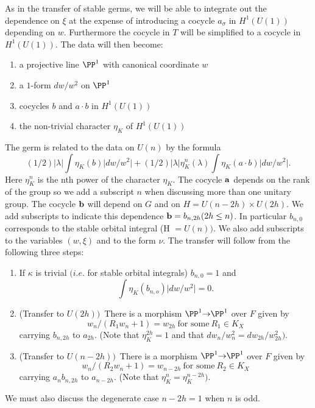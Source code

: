 \documentclass{memo-l}
\theoremstyle{definition}
\theoremstyle{remark}
\numberwithin{section}{chapter}
\numberwithin{equation}{chapter}
\begin{document}
\medpagebreak

   As in the transfer of stable germs, we will be able to integrate out the
dependence on ${\xi}$ at the expense of introducing a cocycle
$a_{{\sigma}}$ in $H^{1}(U(1))$ depending on $w$.  Furthermore the cocycle
in $T$ will be simplified to a cocycle in $H^{1}(U(1))$.  The data will
then become:
\begin{enumerate}[label=\arabic*.]
\item a projective line ${\PP}^{1}$ with canonical coordinate $w$
\item a $1$-form $dw/w^{2}$ on ${\PP}^{1}$
\item cocycles $b$ and $a\cdot b$ in $H^{1}(U(1))$
\item the non-trivial character ${\eta}_{K}$ of $H^{1}(U(1))$
\end{enumerate}
\medpagebreak

\noindent
The germ is related to the data on $U(n)$ by the formula
$$
(1/2)\vert {\lambda}\vert \int{\eta}_{K}(b)\vert dw/w^{2}\vert +
(1/2)\vert {\lambda}\vert {\eta}_{K}^{n}({\lambda})
\int{\eta}_{K}(a\cdot b)\vert dw/w^{2}\vert.
$$
Here ${\eta}_{K}^{n}$ is the nth power of the character ${\eta}_{K}$.  The
cocycle ${\bold a}$ depends on the rank of the group so we add a subscript
$n$ when discussing more than one unitary group.  The cocycle ${\bold b}$
will depend on $G$ and on $H  =  U(n-2h) \times U(2h)$.  We add subscripts to
indicate this dependence ${\bold b}  =  b_{n,2h} (2h \le n)$.  In
particular $b_{n,0}$ corresponds to the stable orbital integral (H $ = 
U(n))$.  We also add subscripts to the variables $(w,{\xi})$ and to the
form ${\nu}$.  The transfer will follow from the following three steps:
\begin{enumerate}[label=\arabic*.]
\item If ${\kappa}$ is trivial $(i.e$.  for stable orbital integrals)
$b_{n,0}  =  1$ and $$\int{\eta}_{K}(b_{n,o})\vert dw/w^{2}\vert  =  0.$$
\item (Transfer to $U(2h))$\ There is a morphism ${\PP}^{1} {\to} 
{\PP}^{1}$ over $F$ given by
$$
w_{n}/(R_{1}w_{n} + 1)  =  w_{2h}\ {\text{for\ some}}\  R_{1}  \in  K_X
$$
carrying $b_{n,2h}$ to $a_{2h}$.  
(Note that ${\eta}_{K}^{2h}  =  1$
and that $dw_{n}/w_{n}^{2}  =  dw_{2h}/w_{2h}^{2})$.
\smallskip
\item (Transfer to $U(n-2h))$\ There is a morphism ${\PP}^{1} {\to} 
{\PP}^{1}$ over $F$ given by
$$
w_{n}/(R_{2}w_{n} + 1)  =  w_{n-2h}\ {\text{for\ some}}\  R_{2}  \in  K_X
$$
carrying $a_{n}b_{n,2h}$ to $a_{n-2h}$.  (Note that ${\eta}_{K}^{n}
 =  {\eta}_{K}^{n-2h})$.
\end{enumerate}
\noindent
We must also discuss the degenerate case $n-2h = 1$ when $n$ is odd.
\end{document}
